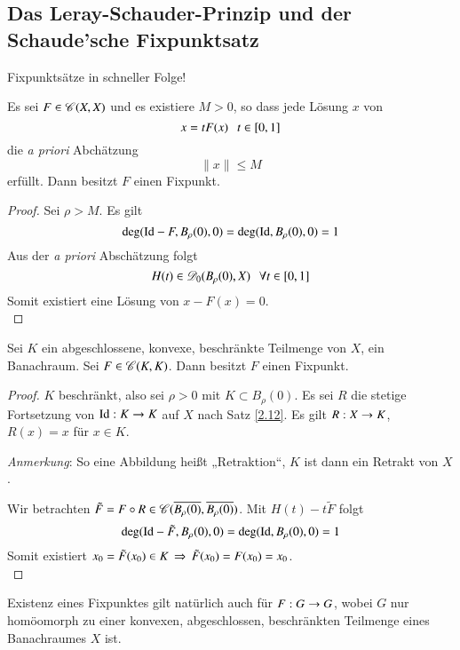 \subsection{Das Leray-Schauder-Prinzip und der Schaude'sche Fixpunktsatz}

Fixpunktsätze in schneller Folge!

\begin{theorem}\label{3.12}
    Es sei $F\in \mathscr C(X,X)$ und es existiere $M>0$, so dass jede Lösung $x$ von
    \[
        x=tF(x) \hspace{.25cm} t\in [0,1]
    \]
    die \textit{a priori} Abchätzung
    \[
        \|x\|\leq M
    \]
    erfüllt. Dann besitzt $F$ einen Fixpunkt.
\end{theorem}

\begin{proof}
    Sei $\rho>M$. Es gilt
    \[
        \deg(\mathrm{Id}-F,B_\rho(0),0)=\deg(\mathrm{Id},B_\rho(0),0)=1
    \]
    Aus der \textit{a priori} Abschätzung folgt
    \[
        H(t)\in \mathscr D_0(B_\rho(0),X) \hspace{.25cm} \forall t\in [0,1]
    \]
    Somit existiert eine Lösung von $x-F(x)=0$.
    \[ \]
\end{proof}

\begin{theorem}\label{3.13}
    Sei $K$ ein abgeschlossene, konvexe, beschränkte Teilmenge von $X$, ein Banachraum. Sei
    $F\in \mathscr C(K,K)$. Dann besitzt $F$ einen Fixpunkt.
\end{theorem}

\begin{proof}
    $K$ beschränkt, also sei $\rho>0$ mit $K\subset B_\rho(0)$. Es sei $R$ die stetige Fortsetzung von
    $\mathrm{Id}:K\rightarrow K$ auf $X$ nach Satz \ref{2.12}. Es gilt $R:X\rightarrow K$, $R(x)=x$ für $x\in K$.

    \noindent\textit{Anmerkung}: So eine Abbildung heißt „Retraktion“, $K$ ist dann ein Retrakt von $X$.

    \noindent Wir betrachten $\tilde F=F\circ R\in \mathscr C(\overline{B_\rho(0)},\overline{B_\rho(0)})$. Mit $H(t)
    -t\tilde F$ folgt
    \[
        \deg(\mathrm{Id}-\tilde F, B_\rho(0),0)=\deg(\mathrm{Id},B_\rho(0),0)=1
    \]
    Somit existiert $x_0=\tilde F(x_0)\in K \, \Rightarrow \, \tilde F(x_0)=F(x_0)=x_0$. 
    \[ \]
\end{proof}

\begin{remark}
    Existenz eines Fixpunktes gilt natürlich auch für $F:G\rightarrow G$, wobei $G$ nur homöomorph zu einer
    konvexen, abgeschlossen, beschränkten Teilmenge eines Banachraumes $X$ ist.
\end{remark}


